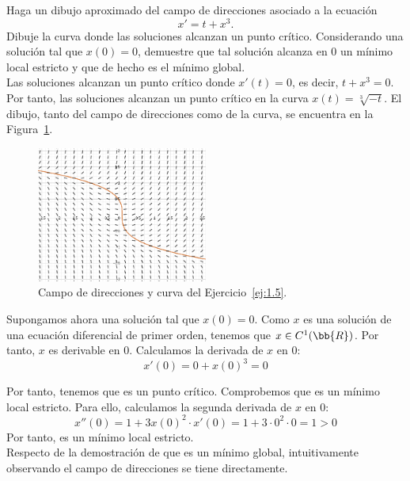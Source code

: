 \begin{ejercicio} \label{ej:1.5}
    Haga un dibujo aproximado del campo de direcciones asociado a la ecuación
    \begin{equation*}
        x' = t + x^3.
    \end{equation*}
    Dibuje la curva donde las soluciones alcanzan un punto crítico. Considerando una solución tal que \(x(0) = 0\), demuestre que tal solución alcanza en 0 un mínimo local estricto y que de hecho es el mínimo global.\\

    Las soluciones alcanzan un punto crítico donde $x'(t)=0$, es decir, $t+x^3=0$. Por tanto, las soluciones alcanzan un punto crítico en la curva $x(t)=\sqrt[3]{-t}$.
    El dibujo, tanto del campo de direcciones como de la curva, se encuentra en la Figura~\ref{fig:ej1.5}.
    \begin{figure}[H]
        \centering
        \includegraphics[width=0.5\textwidth]{Imagenes/Rel1_Ej5.png}
        \caption{Campo de direcciones y curva del Ejercicio~\ref{ej:1.5}.}
        \label{fig:ej1.5}
    \end{figure}

    Supongamos ahora una solución tal que $x(0)=0$. Como $x$ es una solución de una ecuación diferencial de primer orden, tenemos que $x\in C^1(\bb{R})$. Por tanto, $x$ es derivable en $0$. Calculamos la derivada de $x$ en $0$:
    \begin{equation*}
        x'(0) = 0 + x(0)^3 = 0
    \end{equation*}

    Por tanto, tenemos que es un punto crítico. Comprobemos que es un mínimo local estricto. Para ello, calculamos la segunda derivada de $x$ en $0$:
    \begin{equation*}
        x''(0) = 1 + 3x(0)^2\cdot x'(0) = 1 + 3\cdot 0^2\cdot 0 = 1 > 0
    \end{equation*}
    Por tanto, es un mínimo local estricto.\\
    
    Respecto de la demostración de que es un mínimo global, intuitivamente observando el campo de direcciones se tiene directamente.
\end{ejercicio}


